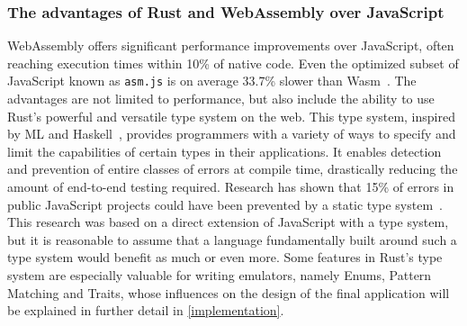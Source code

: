 \subsubsection{The advantages of Rust and WebAssembly over JavaScript}
WebAssembly offers significant performance improvements over JavaScript, often reaching execution times within 10\% of native code. Even the optimized subset of JavaScript known as \verb+asm.js+ is on average 33.7\% slower than Wasm~\cite[Chapter~7.3]{wasmspeed}.
The advantages are not limited to performance, but also include the ability to use Rust's powerful and versatile type system on the web.
This type system, inspired by ML and Haskell~\cite{rustinfluences}, provides programmers with a variety of ways to specify and limit the capabilities of certain types in their applications.
It enables detection and prevention of entire classes of errors at compile time, drastically reducing the amount of end-to-end testing required. Research has shown that 15\% of errors in public JavaScript projects could have been prevented by a static type system~\cite{7985711}.
This research was based on a direct extension of JavaScript with a type system, but it is reasonable to assume that a language fundamentally built around such a type system would benefit as much or even more.
Some features in Rust's type system are especially valuable for writing emulators, namely Enums, Pattern Matching and Traits, whose influences on the design of the final application will be explained in further detail in \cref{implementation}.



